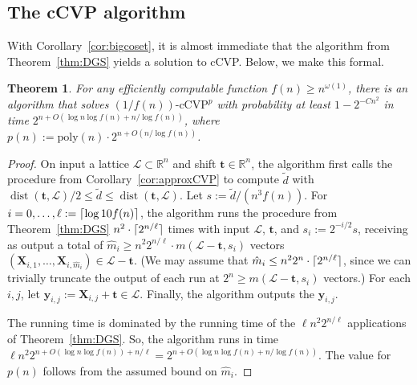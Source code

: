 \documentclass[11pt]{article}
\newtheorem{theorem}{Theorem}[section]
\newcommand{\R}{\ensuremath{\mathbb{R}}}
\renewcommand{\vec}[1]{\ensuremath{\mathbf{#1}}}
\newcommand{\problem}[1]{\mbox{#1}\xspace}
\newcommand{\poly}{\mathrm{poly}}
\newcommand{\lat}{\mathcal{L}}
\DeclareMathOperator{\dist}{dist}
\DeclarePairedDelimiter\ceil{\lceil}{\rceil}
\begin{document}
\subsection{The cCVP algorithm}

With Corollary~\ref{cor:bigcoset}, it is almost immediate that the algorithm from Theorem~\ref{thm:DGS} yields a solution to cCVP. Below, we make this formal.

\begin{theorem}
\label{thm:nCVP}
For any efficiently computable function $f(n) \geq n^{\omega(1)}$, there is an algorithm that solves $(1/f(n))\text{-}\problem{cCVP}^{p}$ with probability at least $1-2^{-Cn^2}$ in time $2^{n+O(\log n \log f(n)+n/\log f(n))}$, where $p(n) := \poly(n) \cdot 2^{n+O(n/\log f(n))}  $.
\end{theorem}
\begin{proof}
On input a lattice $\lat \subset \R^n$ and shift $\vec{t} \in \R^n$, the algorithm first calls the procedure from Corollary~\ref{cor:approxCVP} to compute $\tilde{d}$ with $\dist(\vec{t}, \lat)/2 \leq \tilde{d} \leq \dist(\vec{t}, \lat)$. Let $s := \tilde{d}/(n^3 f(n)) $. For $i = 0, \ldots, \ell := \ceil{\log 10 f(n)}$, the algorithm runs the procedure from Theorem~\ref{thm:DGS} $n^2 \cdot \ceil{ 2^{n/\ell}}$ times with input $\lat$, $\vec{t}$, and $s_i := 2^{-i/2}s$, receiving as output a total of $\hat{m}_i \geq n^2 2^{n/\ell} \cdot  m(\lat - \vec{t}, s_i)$ vectors $(\vec{X}_{i,1},\ldots, \vec{X}_{i,\hat{m}_i}) \in  \lat - \vec{t}$. (We may assume that $\hat{m}_i \leq n^2 2^{n} \cdot \ceil{2^{n/\ell}}$, since we can trivially truncate the output of each run at $2^n \geq m(\lat - \vec{t}, s_i)$ vectors.) For each $i,j$, let $\vec{y}_{i,j} := \vec{X}_{i,j} + \vec{t} \in \lat$. Finally, the algorithm outputs the $\vec{y}_{i,j}$.

The running time is dominated by the running time of the $\ell n^2 2^{n/\ell}$ applications of Theorem~\ref{thm:DGS}. So, the algorithm runs in time $\ell n^2 2^{n + O(\log n\log f(n)) + n/\ell} = 2^{n+O(\log n \log f(n)+n/\log f(n))}$. The value for $p(n)$ follows from the assumed bound on $\hat{m}_i$. 


\end{proof}
\end{document}

